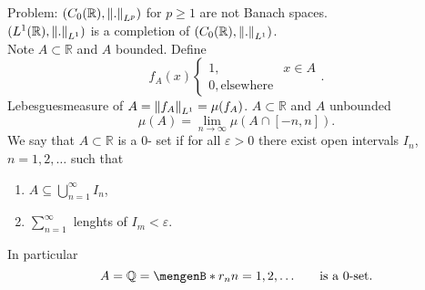 \begin{bemerkung}
\begin{itemize}
		Problem: $(C_0(\mathbb{R}), \norm{.}_{L^p})$ for $p \geq 1$ are not Banach spaces. \\
		$(L^1(\mathbb{R}),\norm{.}_{L^1})$ is a completion of $(C_0(\mathbb{R}),\norm{.}_{L^1})$. \\
		Note $A \subset \mathbb{R}$ and $A$ bounded. Define
		\[
			f_A(x) \begin{cases}
				1, & x \in A\\
				0, \text{elsewhere}
			\end{cases}.
		\]
		Lebesguesmeasure of $A = \norm{f_A}_{L^1} = \mu(f_A)$. $A \subset \mathbb{R}$ and $A$ unbounded
		\[
			\mu(A) = \lim_{n \to \infty} \mu ( A \cap [-n,n]).
		\]
		We say that $A \subset \mathbb{R}$ is a $0$- set if for all $\varepsilon >0$ there exist open intervals $I_n$, $n=1,2, \dots$ such that
		\begin{enumerate}[(1)]
			\item $ A \subseteq \bigcup_{n=1}^{\infty}I_n$,
			\item $\sum_{n=1}^{\infty}$ lenghts of $I_m < \varepsilon$.
		\end{enumerate} 
		In particular
		\[
			A = \mathbb{Q} = \set[r_n]{n=1,2,\dots}\qquad \text{is a $0$-set}.	
		\]
	\end{itemize}
\end{bemerkung}